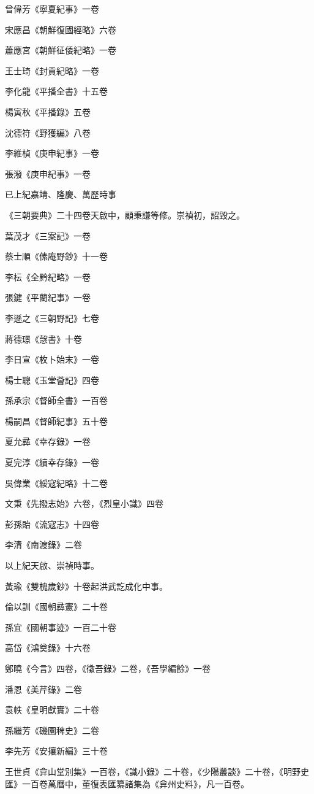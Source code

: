 曾偉芳《寧夏紀事》一卷

宋應昌《朝鮮復國經略》六卷

蕭應宮《朝鮮征倭紀略》一卷

王士琦《封貢紀略》一卷

李化龍《平播全書》十五卷

楊寅秋《平播錄》五卷

沈德符《野獲編》八卷

李維楨《庚申紀事》一卷

張潑《庚申紀事》一卷

已上紀嘉靖、隆慶、萬歷時事

《三朝要典》二十四卷天啟中，顧秉謙等修。崇禎初，詔毀之。

葉茂才《三案記》一卷

蔡士順《傃庵野鈔》十一卷

李枟《全黔紀略》一卷

張鍵《平藺紀事》一卷

李遜之《三朝野記》七卷

蔣德璟《愨書》十卷

李日宣《枚卜始末》一卷

楊士聰《玉堂薈記》四卷

孫承宗《督師全書》一百卷

楊嗣昌《督師紀事》五十卷

夏允彞《幸存錄》一卷

夏完淳《續幸存錄》一卷

吳偉業《綏寇紀略》十二卷

文秉《先撥志始》六卷，《烈皇小識》四卷

彭孫貽《流寇志》十四卷

李清《南渡錄》二卷

以上紀天啟、崇禎時事。

黃瑜《雙槐歲鈔》十卷起洪武訖成化中事。

倫以訓《國朝彞憲》二十卷

孫宜《國朝事迹》一百二十卷

高岱《鴻奠錄》十六卷

鄭曉《今言》四卷，《徵吾錄》二卷，《吾學編餘》一卷

潘恩《美芹錄》二卷

袁帙《皇明獻實》二十卷

孫繼芳《磯園稗史》二卷

李先芳《安攘新編》三十卷

王世貞《弇山堂別集》一百卷，《識小錄》二十卷，《少陽叢談》二十卷，《明野史匯》一百卷萬曆中，董復表匯纂諸集為《弇州史料》，凡一百卷。

